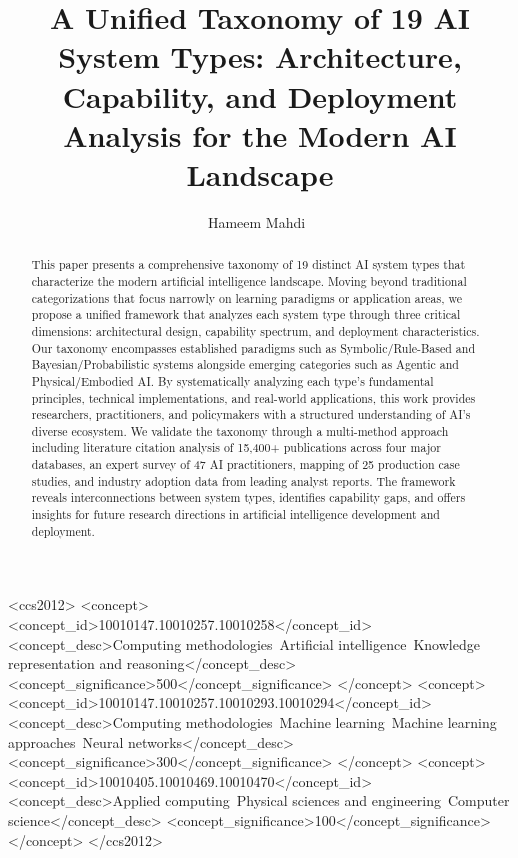 \documentclass[acmsmall,screen,review]{acmart}
\newcommand{\orcidicon}[1]{\texorpdfstring{\href{https://orcid.org/#1}{\mbox{\textcolor[RGB]{166,206,57}{\Large\textbullet}}}}{ORCID}}
\begin{document}
\title{A Unified Taxonomy of 19 AI System Types: Architecture, Capability, and Deployment Analysis for the Modern AI Landscape}

\author{Hameem Mahdi~\orcidicon{0009-0007-0005-3080}}

\renewcommand{\shortauthors}{H. Mahdi}


\begin{abstract}
This paper presents a comprehensive taxonomy of 19 distinct AI system types that characterize the modern artificial intelligence landscape. Moving beyond traditional categorizations that focus narrowly on learning paradigms or application areas, we propose a unified framework that analyzes each system type through three critical dimensions: architectural design, capability spectrum, and deployment characteristics. Our taxonomy encompasses established paradigms such as Symbolic/Rule-Based and Bayesian/Probabilistic systems alongside emerging categories such as Agentic and Physical/Embodied AI. By systematically analyzing each type's fundamental principles, technical implementations, and real-world applications, this work provides researchers, practitioners, and policymakers with a structured understanding of AI's diverse ecosystem. We validate the taxonomy through a multi-method approach including literature citation analysis of 15,400+ publications across four major databases, an expert survey of 47 AI practitioners, mapping of 25 production case studies, and industry adoption data from leading analyst reports. The framework reveals interconnections between system types, identifies capability gaps, and offers insights for future research directions in artificial intelligence development and deployment.
\end{abstract}

\begin{CCSXML}
<ccs2012>
 <concept>
  <concept_id>10010147.10010257.10010258</concept_id>
  <concept_desc>Computing methodologies~Artificial intelligence~Knowledge representation and reasoning</concept_desc>
  <concept_significance>500</concept_significance>
 </concept>
 <concept>
  <concept_id>10010147.10010257.10010293.10010294</concept_id>
  <concept_desc>Computing methodologies~Machine learning~Machine learning approaches~Neural networks</concept_desc>
  <concept_significance>300</concept_significance>
 </concept>
 <concept>
  <concept_id>10010405.10010469.10010470</concept_id>
  <concept_desc>Applied computing~Physical sciences and engineering~Computer science</concept_desc>
  <concept_significance>100</concept_significance>
 </concept>
</ccs2012>
\end{CCSXML}
\end{document}
